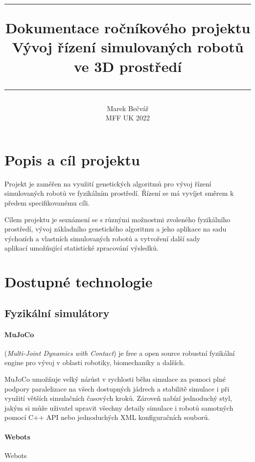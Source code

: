 \documentclass[a4paper, 12pt]{article}
\title{
        \vspace{1in}
        \rule{\linewidth}{0.5pt}
		\usefont{OT1}{bch}{b}{n}
        \huge Dokumentace ročníkového projektu \\\vspace{20pt}Vývoj řízení
        simulovaných robotů ve 3D prostředí
        \vspace{-10pt}
        \rule{\linewidth}{1pt}
}
\author{
		\normalfont\normalsize
        Marek Bečvář\\\normalsize
        MFF UK 2022
}
\date{}
\begin{document}
\maketitle 
\newpage

\tableofcontents
\newpage

\section{Popis a cíl projektu} 
\paragraph{}
Projekt je zaměřen na využití genetických algoritmů pro vývoj řízení simulovaných 
robotů ve fyzikálním prostředí. Řízení se má vyvíjet směrem k předem
specifikovanému cíli. 

Cílem projektu je seznámení se s různými možnostmi zvoleného fyzikálního
prostředí, vývoj základního genetického algoritmu a jeho aplikace na sadu
výchozích a vlastních simulovaných robotů a vytvoření další sady \\aplikací
umožňující statistické zpracování výsledků. 

\section{Dostupné technologie}
\subsection{Fyzikální simulátory}
\paragraph {MuJoCo} (\emph{Multi-Joint Dynamics with Contact}) je free a open 
source robustní fyzikální engine pro vývoj v oblasti robotiky, biomechaniky a dalších.

MuJoCo umožňuje velký nárůst v rychlosti běhu simulace za pomoci plné podpory
paralelizace na všech dostupných jádrech a stabilitě simulace i při využití
větších simulačních časových kroků. Zároveň nabízí jednoduchý styl,
jakým si může uživatel upravit všechny detaily simulace i robotů samotných
pomocí C++ API nebo jednoduchých XML konfiguračních souborů. 

\paragraph{Webots}
Webots 
\end{document}
